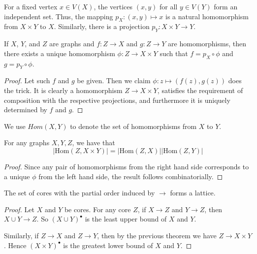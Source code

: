 For a fixed vertex $x\in V(X)$, the vertices $(x,y)$ for all $y\in V(Y)$ form an independent set.  Thus, the mapping $p_X:(x,y)\mapsto x$ is a natural homomorphism from $X\times Y$ to $X$.  Similarly, there is a projection $p_Y:X\times Y\rightarrow Y$.

\begin{theorem}
	If $X$, $Y$, and $Z$ are graphs and $f:Z\rightarrow X$ and $g:Z\rightarrow Y$ are homomorphisms, then there exists a unique homomorphism $\phi:Z\rightarrow X\times Y$ such that $f=p_X\circ \phi$ and $g=p_Y\circ \phi$.
\end{theorem}

\begin{proof}
	Let such $f$ and $g$ be given.  Then we claim $\phi:z\mapsto(f(z),g(z))$ does the trick.  It is clearly a homomorphism $Z\rightarrow X\times Y$, satisfies the requirement of composition with the respective projections, and furthermore it is uniquely determined by $f$ and $g$.
\end{proof}

We use $Hom(X,Y)$ to denote the set of homomorphisms from $X$ to $Y$.

\begin{corollary}
	For any graphs $X,Y,Z$, we have that $$|\mathrm{Hom}(Z,X\times Y)|=|\mathrm{Hom}(Z,X)||\mathrm{Hom}(Z,Y)|$$
\end{corollary}
\begin{proof}
	Since any pair of homomorphisms from the right hand side corresponds to a unique $\phi$ from the left hand side, the result follows combinatorially.
\end{proof}


\begin{lemma}
	The set of cores with the partial order induced by $\rightarrow$ forms a lattice.
\end{lemma}
\begin{proof}
	Let $X$ and $Y$ be cores.  For any core $Z$, if $X\rightarrow Z$ and $Y\rightarrow Z$, then $X\cup Y\rightarrow Z$.  So $(X\cup Y)^\bullet$ is the least upper bound of $X$ and $Y$.
	
	Similarly, if $Z\rightarrow X$ and $Z\rightarrow Y$, then by the previous theorem we have $Z\rightarrow X\times Y$.  Hence $(X\times Y)^\bullet$ is the greatest lower bound of $X$ and $Y$. 
\end{proof}

